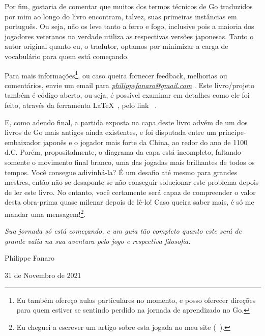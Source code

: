 \pagebreak

Por fim, gostaria de comentar que muitos dos termos técnicos de Go traduzidos por mim ao longo do livro encontram, talvez, suas primeiras instâncias em português. Ou seja, não os leve tanto a ferro e fogo, inclusive pois a maioria dos jogadores veteranos na verdade utiliza as respectivas versões japonesas. Tanto o autor original quanto eu, o tradutor, optamos por minimizar a carga de vocabulário para quem está começando.

\bigskip
\bigskip

Para mais informações\footnote{Eu também ofereço aulas particulares no momento, e posso oferecer direções para quem estiver se sentindo perdido na jornada de aprendizado no Go.}, ou caso queira fornecer feedback, melhorias ou comentários, envie um email para \emph{\href{mailto:philippefanaro@gmail.com}{philippefanaro@gmail.com}} \cite{fanaro_email}. Este livro/projeto também é código-aberto, ou seja, é possível examinar em detalhes como ele foi feito, através da ferramenta \LaTeX~\cite{latex}, pelo link \href{https://github.com/FanaroEngineering/traducao_como_jogar_go}{}~\cite{repo_github}.

E, como adendo final, a partida exposta na capa deste livro advém de um dos livros de Go mais antigos ainda existentes, e foi disputada entre um príncipe-embaixador japonês e o jogador mais forte da China, ao redor do ano de 1100 d.C. Porém, propositalmente, o diagrama da capa está incompleto, faltando somente o movimento final branco, uma das jogadas mais brilhantes de todos os tempos. Você consegue adivinhá-la? É um desafio até mesmo para grandes mestres, então não se desaponte se não conseguir solucionar este problema depois de ler este livro. No entanto, você certamente será capaz de compreender o valor desta obra-prima quase milenar depois de lê-lo! Caso queira saber mais, é só me mandar uma mensagem!\footnote{Eu cheguei a escrever um artigo sobre esta jogada no meu site (\href{https://fanaro.io/articles/tesuji_mor/tesuji_mor.html}{}~\cite{tesuji_mor}).}.

\bigskip
\bigskip

\emph{Sua jornada só está começando, e um guia tão completo quanto este será de grande valia na sua aventura pelo jogo e respectiva filosofia.}

\bigskip
\bigskip

Philippe Fanaro

31 de Novembro de 2021
